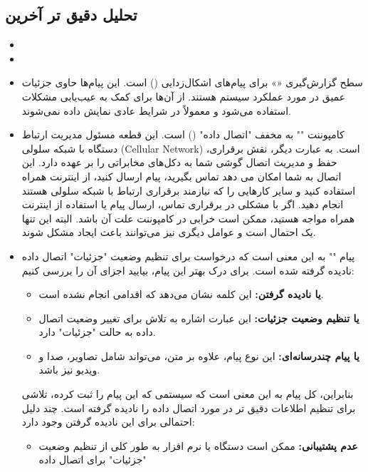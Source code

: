 \documentclass{report}
\begin{document}
\subsection*{تحلیل دقیق تر آخرین
}
\begin{itemize}
	\item {}
	\item {}
	\item  سطح گزارش‌گیری
	 «»
	  برای پیام‌های اشکال‌زدایی () است. این پیام‌ها حاوی جزئیات عمیق در مورد عملکرد سیستم هستند. از آن‌ها برای کمک به عیب‌یابی مشکلات استفاده می‌شود و معمولاً در شرایط عادی نمایش داده نمی‌شوند.
	  \item 
	  کامپوننت 
	 ""
	   به مخفف "اتصال داده" 
	   () 
	   است. این قطعه مسئول مدیریت ارتباط دستگاه با شبکه سلولی ({Cellular Network}\lr) است.
	  به عبارت دیگر، 
	   نقش برقراری، حفظ و مدیریت اتصال گوشی شما به دکل‌های مخابراتی را بر عهده دارد. این اتصال به شما امکان می دهد تماس بگیرید، پیام ارسال کنید، از اینترنت همراه استفاده کنید و سایر کارهایی را که نیازمند برقراری ارتباط با شبکه سلولی هستند انجام دهید.
	  اگر با مشکلی در برقراری تماس، ارسال پیام یا استفاده از اینترنت همراه مواجه هستید، ممکن است خرابی در کامپوننت
	    علت آن باشد. البته این تنها یک احتمال است و عوامل دیگری نیز می‌توانند باعث ایجاد مشکل شوند.
	  \item 
	  پیام 
	  ""
	   به این معنی است که درخواست برای تنظیم وضعیت "جزئیات" اتصال داده
	    نادیده گرفته شده است. برای درک بهتر این پیام، بیایید اجزای آن را بررسی کنیم:
	 \begin{itemize}
	 	\item \textbf{
	 	یا نادیده گرفتن:}  این کلمه نشان می‌دهد که اقدامی انجام نشده است.
	 	\item 
	\textbf{
	یا تنظیم وضعیت جزئیات:} این عبارت اشاره به تلاش برای تغییر وضعیت اتصال داده 
	به حالت "جزئیات" دارد.
	\item
\textbf{
یا پیام چندرسانه‌ای:} این نوع پیام، علاوه بر متن، می‌تواند شامل تصاویر، صدا و ویدیو نیز باشد.
	 \end{itemize}
	  بنابراین، کل پیام به این معنی است که سیستمی که این پیام را ثبت کرده، تلاشی برای تنظیم اطلاعات دقیق تر در مورد اتصال داده
	    را نادیده گرفته است.
	  چند دلیل احتمالی برای این نادیده گرفتن وجود دارد:
	  \begin{itemize}
	  	 \item 
	  	 \textbf{عدم پشتیبانی:} ممکن است دستگاه یا نرم افزار به طور کلی از تنظیم وضعیت "جزئیات" برای اتصال داده 

\end{itemize}
\end{itemize}
\end{document}
